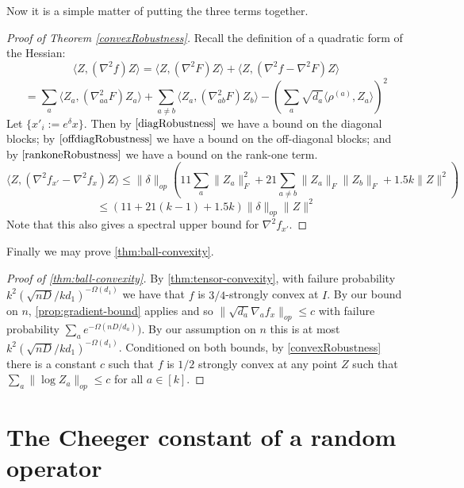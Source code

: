 \documentclass{article}
\newcommand\samp{x}
\newcommand{\CF}[1]{{\color{purple}[CF: #1]}}
\newcommand{\AR}[1]{{\color{orange}[AR: #1]}}
\begin{document}
Now it is a simple matter of putting the three terms together. 

\begin{proof} [Proof of Theorem \cref{convexRobustness}]
Recall the definition of a quadratic form of the Hessian:
\[ \langle Z, (\nabla^{2} f) Z \rangle = \langle Z, (\nabla^{2} F) Z \rangle + \langle Z, (\nabla^{2} f - \nabla^{2} F) Z \rangle     \]
\[ = \sum_{a} \langle Z_{a}, (\nabla^{2}_{aa} F) Z_{a} \rangle + \sum_{a \neq b} \langle Z_{a}, (\nabla^{2}_{ab} F) Z_{b} \rangle - \left( \sum_{a} \sqrt{d_{a}} \langle \rho^{(a)}, Z_{a} \rangle  \right)^{2}       \]
Let $\{\samp'_{i} := e^{\delta} \samp\}$. Then by $\cref{diagRobustness}$ we have a bound on the diagonal blocks; by $\cref{offdiagRobustness}$ we have a bound on the off-diagonal blocks; and by $\cref{rankoneRobustness}$ we have a bound on the rank-one term. 
\[ \langle Z, (\nabla^2 f_{\samp'} - \nabla^{2} f_{\samp}) Z \rangle \leq \|\delta\|_{op} \left( 11 \sum_{a} \|Z_{a}\|_{F}^{2} + 21 \sum_{a \neq b} \|Z_{a}\|_{F} \|Z_{b}\|_{F} + 1.5 k \|Z\|^{2} \right)   \]
\[ \leq (11 + 21(k-1) + 1.5 k) \|\delta\|_{op} \|Z\|^{2}    \]
Note that this also gives a spectral upper bound for $\nabla^{2} f_{\samp'}$. 
\end{proof}

Finally we may prove \cref{thm:ball-convexity}.
\begin{proof}[Proof of \cref{thm:ball-convexity}]
By \cref{thm:tensor-convexity}, with failure probability $k^2 ({\sqrt{nD}}/{kd_1})^{ - \Omega(d_1)}$ we have that $f$ is $3/4$-strongly convex at $I$. By our bound on $n$,  \cref{prop:gradient-bound} applies and so $\|\sqrt{d_{a}} \nabla_{a} f_{\samp}\|_{op} \leq c$ with failure probability $\sum_a e^{ - \Omega(nD/d_a)})$. By our assumption on $n$ this is at most $k^2 ({\sqrt{nD}}/{kd_1})^{ - \Omega(d_1)}$. Conditioned on both bounds, by \cref{convexRobustness} there is a constant $c$ such that $f$ is $1/2$ strongly convex at any point $Z$ such that $\sum_a \|\log Z_a\|_{op} \leq  c$ for all $a \in [k]$. \end{proof}









\section{The Cheeger constant of a random operator}
\end{document}
